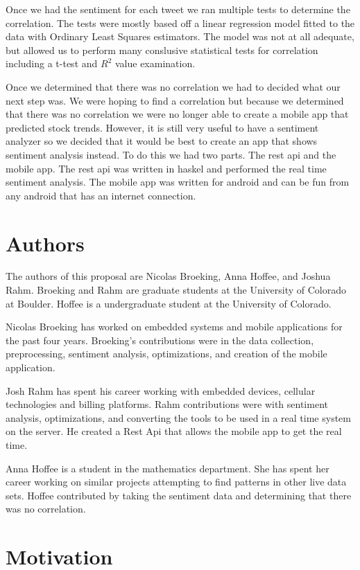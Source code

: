 \documentclass{acm_proc_article-sp}
\begin{document}
Once we had the sentiment for each tweet we ran multiple tests to determine the correlation. 
The tests were mostly based off a linear regression model fitted to the data with Ordinary 
Least Squares estimators. The model was not at all adequate, but allowed us to perform 
many conslusive statistical tests for correlation including a t-test and $R^2$ value examination. 

Once we determined that there was no correlation we had to decided what our
next step was. We were hoping to find a correlation but because we determined
that there was no correlation we were no longer able to create a mobile app
that predicted stock trends. However, it is still very useful to have a
sentiment analyzer so we decided that it would be best to create an app that
shows sentiment analysis instead. To do this we had two parts.  The rest api
and the mobile app. The rest api was written in haskel and performed the real
time sentiment analysis.  The mobile app was written for android and can be fun
from any android that has an internet connection. 


\section{Authors}

The authors of this proposal are Nicolas Broeking, Anna
Hoffee, and Joshua Rahm. Broeking and Rahm are graduate students at the
University of Colorado at Boulder. Hoffee is a undergraduate student at the
University of Colorado.

 Nicolas Broeking has worked on embedded systems and mobile applications for
the past four years. Broeking's contributions were in the data collection,
preprocessing, sentiment analysis, optimizations, and creation of the mobile
application. 

Josh Rahm has spent his career working with embedded devices, cellular
technologies and billing platforms. Rahm contributions were with sentiment
analysis, optimizations, and converting the tools to be used in a real time
system on the server. He created a Rest Api that allows the mobile app to get
the real time.

Anna Hoffee is a student in the mathematics department. She has spent her
career working on similar projects attempting to find patterns in other live
data sets. Hoffee contributed by taking the sentiment data and determining that
there was no correlation.

\section{Motivation}
\end{document}
